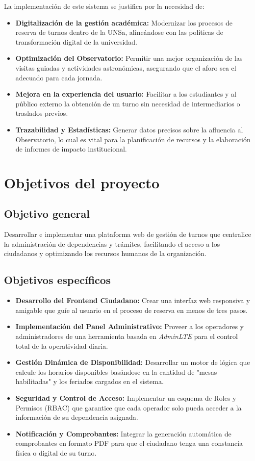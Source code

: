 La implementación de este sistema se justifica por la necesidad de:
\begin{itemize}
    \item \textbf{Digitalización de la gestión académica:} Modernizar los procesos de reserva de turnos dentro de la UNSa, alineándose con las políticas de transformación digital de la universidad.
    \item \textbf{Optimización del Observatorio:} Permitir una mejor organización de las visitas guiadas y actividades astronómicas, asegurando que el aforo sea el adecuado para cada jornada.
    \item \textbf{Mejora en la experiencia del usuario:} Facilitar a los estudiantes y al público externo la obtención de un turno sin necesidad de intermediarios o traslados previos.
    \item \textbf{Trazabilidad y Estadísticas:} Generar datos precisos sobre la afluencia al Observatorio, lo cual es vital para la planificación de recursos y la elaboración de informes de impacto institucional.
\end{itemize}

\section{Objetivos del proyecto}

\subsection{Objetivo general}
Desarrollar e implementar una plataforma web de gestión de turnos que centralice la administración de dependencias y trámites, facilitando el acceso a los ciudadanos y optimizando los recursos humanos de la organización.

\subsection{Objetivos específicos}
\begin{itemize}
    \item \textbf{Desarrollo del Frontend Ciudadano:} Crear una interfaz web responsiva y amigable que guíe al usuario en el proceso de reserva en menos de tres pasos.
    \item \textbf{Implementación del Panel Administrativo:} Proveer a los operadores y administradores de una herramienta basada en \textit{AdminLTE} para el control total de la operatividad diaria.
    \item \textbf{Gestión Dinámica de Disponibilidad:} Desarrollar un motor de lógica que calcule los horarios disponibles basándose en la cantidad de "mesas habilitadas" y los feriados cargados en el sistema.
    \item \textbf{Seguridad y Control de Acceso:} Implementar un esquema de Roles y Permisos (RBAC) que garantice que cada operador solo pueda acceder a la información de su dependencia asignada.
    \item \textbf{Notificación y Comprobantes:} Integrar la generación automática de comprobantes en formato PDF para que el ciudadano tenga una constancia física o digital de su turno.
\end{itemize}

